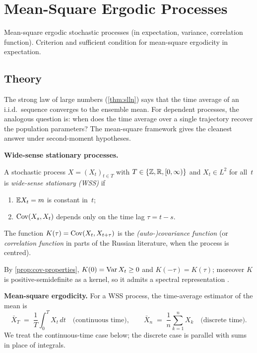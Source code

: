 
\section{Mean-Square Ergodic Processes}
\label{sec:1.2.08-ergodicity}

\begin{ticket}
Mean-square ergodic stochastic processes (in expectation, variance, correlation function). Criterion and sufficient condition for mean-square ergodicity in expectation.
\end{ticket}

\subsection*{Theory}

The strong law of large numbers (\cref{thm:slln}) says that the
time average of an i.i.d.\ sequence converges to the ensemble mean.
For dependent processes, the analogous question is: when does the
time average over a single trajectory recover the population
parameters? The mean-square framework gives the cleanest answer
under second-moment hypotheses.

\medskip
\noindent\textbf{Wide-sense stationary processes.}

\begin{definition}
\label{def:wss}
A stochastic process $X = (X_t)_{t \in T}$ with $T \in \{\mathbb{Z}, \mathbb{R}, [0, \infty)\}$
and $X_t \in L^2$ for all~$t$ is \emph{wide-sense stationary
(WSS)} if
\begin{enumerate}[label=(\alph*)]
  \item $\mathbb{E} X_t = m$ is constant in~$t$;
  \item $\operatorname{Cov}(X_s, X_t)$ depends only on the time lag $\tau = t - s$.
\end{enumerate}
The function $K(\tau) = \operatorname{Cov}(X_t, X_{t + \tau})$ is the
\emph{(auto-)covariance function} (or \emph{correlation function} in
parts of the Russian literature, when the process is centred).
\end{definition}

By \cref{prop:cov-properties}, $K(0) = \operatorname{Var} X_t \geq 0$ and $K(-\tau) = K(\tau)$;
moreover $K$ is positive-semidefinite as a kernel, so it admits a
spectral representation \cite[Ch.~VI, \S~1]{Sevastyanov1982}.

\medskip
\noindent\textbf{Mean-square ergodicity.} For a WSS process, the
time-average estimator of the mean is
\[
  \bar X_T \;=\; \frac{1}{T} \int_0^{T} X_t\, dt \quad \text{(continuous time)}, \qquad
  \bar X_n \;=\; \frac{1}{n} \sum_{k=1}^{n} X_k \quad \text{(discrete time)}.
\]
We treat the continuous-time case below; the discrete case is
parallel with sums in place of integrals.

